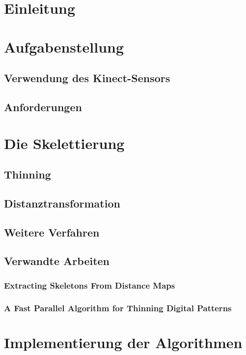 \documentclass[appendixprefix,a4paper,bibliography=totoc,twoside=true,11pt,DIV=11,BCOR=6mm,headsepline,pointlessnumbers]{scrbook}
\begin{document}

\maketitle
\chapter{Einleitung}
\chapter{Aufgabenstellung}
\section{Verwendung des Kinect-Sensors}
\section{Anforderungen}

\chapter{Die Skelettierung}
\section{Thinning}
\section{Distanztransformation}
\section{Weitere Verfahren}
\section{Verwandte Arbeiten}
\subsection{Extracting Skeletons From Distance Maps}
\subsection{A Fast Parallel Algorithm for Thinning Digital Patterns} 


\chapter{Implementierung der Algorithmen}
\end{document}
